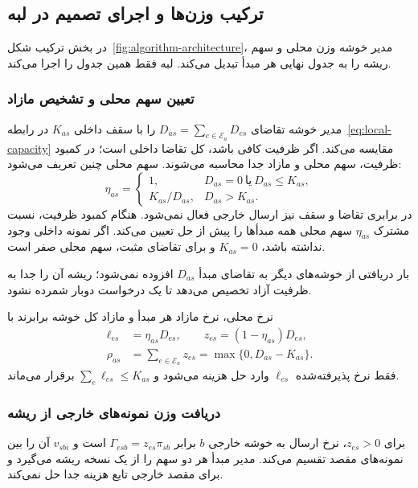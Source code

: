 \subsection{ترکیب وزن‌ها و اجرای تصمیم در لبه}
\label{sec:integration}

در بخش ترکیب شکل~\ref{fig:algorithm-architecture}، مدیر خوشه وزن محلی و سهم ریشه را به جدول نهایی هر مبدأ تبدیل می‌کند. لبه فقط همین جدول را اجرا می‌کند.

\subsubsection{تعیین سهم محلی و تشخیص مازاد}

مدیر خوشه تقاضای $D_{as}=\sum_{e\in\mathcal E_a}D_{es}$ را با سقف داخلی $K_{as}$ در رابطه~\eqref{eq:local-capacity} مقایسه می‌کند. اگر ظرفیت کافی باشد، کل تقاضا داخلی است؛ در کمبود ظرفیت، سهم محلی و مازاد جدا محاسبه می‌شوند. سهم محلی چنین تعریف می‌شود:
\begin{equation}
 \eta_{as}=\begin{cases}
 1,&D_{as}=0\ \text{یا}\ D_{as}\leq K_{as},\\
 K_{as}/D_{as},&D_{as}>K_{as}.
 \end{cases}
 \label{eq:local-gate}
\end{equation}
در برابری تقاضا و سقف نیز ارسال خارجی فعال نمی‌شود. هنگام کمبود ظرفیت، نسبت مشترک $\eta_{as}$ سهم محلی همه مبدأها را پیش از حل تعیین می‌کند. اگر نمونه داخلی وجود نداشته باشد، $K_{as}=0$ و برای تقاضای مثبت، سهم محلی صفر است.

بار دریافتی از خوشه‌های دیگر به تقاضای مبدأ $D_{as}$ افزوده نمی‌شود؛ ریشه آن را جدا به ظرفیت آزاد تخصیص می‌دهد تا یک درخواست دوبار شمرده نشود.

نرخ محلی، نرخ مازاد هر مبدأ و مازاد کل خوشه برابرند با
\begin{align}
 \ell_{es}&=\eta_{as}D_{es},\qquad
 z_{es}=(1-\eta_{as})D_{es},
 \label{eq:local-spill-rates}\\
 \rho_{as}&=\sum_{e\in\mathcal E_a}z_{es}
           =\max\{0,D_{as}-K_{as}\}.
 \label{eq:cluster-spill}
\end{align}
فقط نرخ پذیرفته‌شده $\ell_{es}$ وارد حل هزینه می‌شود و $\sum_e\ell_{es}\leq K_{as}$ برقرار می‌ماند.

\subsubsection{دریافت وزن نمونه‌های خارجی از ریشه}

برای $z_{es}>0$، نرخ ارسال به خوشه خارجی $b$ برابر $\Gamma_{esb}=z_{es}\pi_{sb}$ است و $v_{sbi}$ آن را بین نمونه‌های مقصد تقسیم می‌کند. مدیر مبدأ هر دو سهم را از یک نسخه ریشه می‌گیرد و برای مقصد خارجی تابع هزینه جدا حل نمی‌کند.

